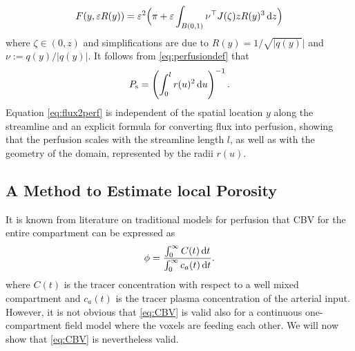 \documentclass[journal,twocolumn]{IEEEtran}
\newcommand{\Perfs}{P_{\mathrm{s}}}
\begin{document}
	\begin{equation}
		F(y,\varepsilon R(y))
		= \varepsilon^2 \Big(\pi + \varepsilon \int_{B(0,1)} \nu^\top J(\zeta)zR(y)^3 \,\mathrm{d} z\Big)
	\end{equation}
	where $\zeta \in (0,z)$ and simplifications are due to $R(y) = 1/\sqrt{\vert q(y)} \vert$ and $\nu:=q(y)/\vert q(y) \vert$.
	It follows from \eqref{eq:perfusiondef} that
	\begin{equation}\label{eq:flux2perf}
		\Perfs= \left(\int_0^l r(u)^2 \diffint u\right)^{-1}.
	\end{equation}
	Equation \eqref{eq:flux2perf} is independent of the spatial location $y$ along the streamline and an explicit formula for converting flux into perfusion, showing that the perfusion scales with the streamline length $l$, as well as with the geometry of the domain, represented by the radii $r(u)$.
	

	

	\subsection{A Method to Estimate local Porosity}\label{sec:CBV}
	
	It is known from literature on traditional models \cite{sourbron13} for perfusion that CBV for the entire compartment can be expressed as
	\begin{equation}
		\phi = \frac{\int_0^\infty C(t) \diffint t}{\int_0^\infty c_a(t) \diffint t}.
		\label{eq:CBV}
	\end{equation}
	where $C(t)$ is the tracer concentration with respect to a well mixed compartment and $c_a(t)$ is the tracer plasma concentration of the arterial input.
	However, it is not obvious that \eqref{eq:CBV} is valid also for a continuous one-compartment field model where the voxels are feeding each other. We will now show that \eqref{eq:CBV} is nevertheless valid.
	
\end{document}
